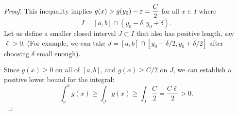 \begin{problem}
\begin{enumerate}[label=(\alph*)]
\begin{proof}
    This inequality implies $g(x) > g(y_0) - \varepsilon = \dfrac{C}{2}$ for all $x \in I$ where  
    \[
      I = [a, b] \cap (y_0 - \delta, y_0 + \delta).
    \]
    Let us define a smaller closed interval $J \subset I$ that also has positive length, say $\ell > 0$.
    (For example, we can take $J = [a,b] \cap [y_0 - \delta/2, y_0 + \delta/2]$
    after choosing $\delta$ small enough).

    Since $g(x) \geq 0$ on all of $[a, b]$, and $g(x) \ge C/2$ on $J$, we can establish a positive
    lower bound for the integral:
    \[
      \int_{a}^{b} g(x) \geq \int_{J} g(x) \geq \int_{J} \frac{C}{2} = \frac{C\ell}{2} > 0.
    \]
  \end{proof}

  \end{enumerate}
\end{problem}


